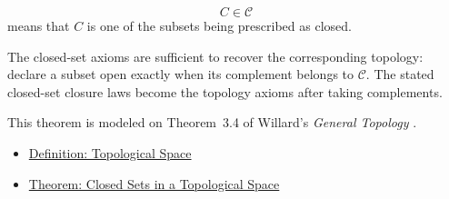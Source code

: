 \begin{remark*}
\[
C\in\mathcal{C}
\]
means that \(C\) is one of the subsets being prescribed as closed.
\end{remark*}

\begin{remark*}[Interpretation]
The closed-set axioms are sufficient to recover the corresponding topology:
declare a subset open exactly when its complement belongs to
\(\mathcal{C}\).  The stated closed-set closure laws become the topology
axioms after taking complements.
\end{remark*}

\begin{remark*}
This theorem is modeled on Theorem~3.4 of Willard's
\emph{General Topology} \cite{WillardGeneralTopology}.
\end{remark*}


\begin{dependencies}
\begin{itemize}
  \item \hyperref[def:topological-space]{Definition: Topological Space}
  \item \hyperref[thm:closed-sets-in-topological-space]{Theorem: Closed Sets in a Topological Space}
\end{itemize}
\end{dependencies}
